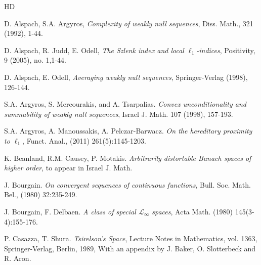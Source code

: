 \documentclass[12pt]{amsart}
\theoremstyle{definition}
\begin{document}
\begin{thebibliography}{HD}

\normalsize
\baselineskip=17pt


  D. Alspach,  S.A. Argyros, \emph{Complexity of weakly null sequences}, Diss. Math., 321 (1992), 1-44.
 
 D. Alspach, R. Judd, E. Odell, \emph{The Szlenk index and local $\ell_1$-indices}, Positivity, 9 (2005), no. 1,1-44. 

 D. Alspach, E. Odell, \emph{Averaging weakly null sequences}, Springer-Verlag (1998), 126-144.  



 S.A. Argyros, S. Mercourakis, and A. Tsarpalias.  \emph{Convex unconditionality and summability of weakly null sequences}, Israel J. Math. 107 (1998), 157-193.  

 S.A. Argyros, A. Manoussakis, A. Pelczar-Barwacz. \emph{On the hereditary proximity to $\ell_1$}, Funct. Anal., (2011) 261(5):1145-1203. 

 K. Beanland, R.M. Causey, P. Motakis. \emph{Arbitrarily distortable Banach spaces of higher order}, to appear in Israel J. Math. 

 J. Bourgain. \emph{On convergent sequences of continuous functions}, Bull. Soc. Math. Bel., (1980) 32:235-249.

 J. Bourgain, F. Delbaen. \emph{A class of special $\mathcal{L}_\infty$ spaces}, Acta Math. (1980) 145(3-4):155-176. 

 P. Casazza, T. Shura. \emph{Tsirelson's Space}, Lecture Notes in Mathematics, vol. 1363, Springer-Verlag, Berlin, 1989, With an appendix by J. Baker, O. Slotterbeck and R. Aron.


\end{thebibliography}
\end{document}
